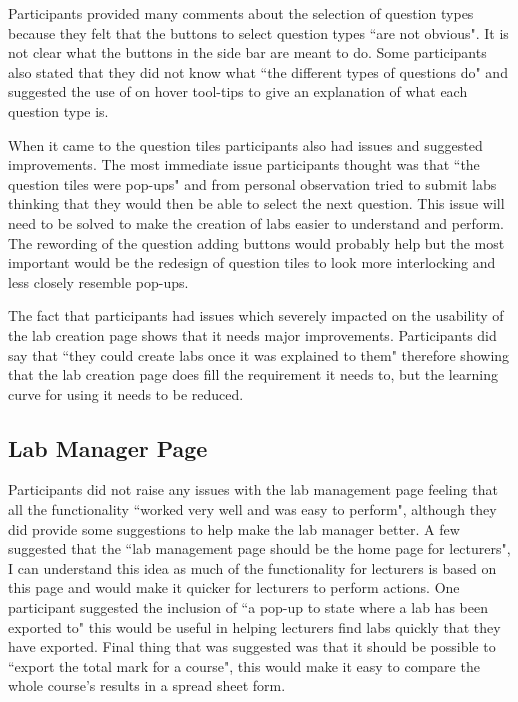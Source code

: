 \documentclass[11pt]{report}
\begin{document}
Participants provided many comments about the selection of question types because they felt that the buttons to select question types ``are not obvious". It is not clear what the buttons in the side bar are meant to do. Some participants also stated that they did not know what ``the different types of questions do" and suggested the use of on hover tool-tips to give an explanation of what each question type is.

When it came to the question tiles participants also had issues and suggested improvements. The most immediate issue participants thought was that ``the question tiles were pop-ups" and from personal observation tried to submit labs thinking that they would then be able to select the next question. This issue will need to be solved to make the creation of labs easier to understand and perform. The rewording of the question adding buttons would probably help but the most important would be the redesign of question tiles to look more interlocking and less closely resemble pop-ups.

The fact that participants had issues which severely impacted on the usability of the lab creation page shows that it needs major improvements. Participants did say that ``they could create labs once it was explained to them" therefore showing that the lab creation page does fill the requirement it needs to, but the learning curve for using it needs to be reduced.



\subsection*{Lab Manager Page}

Participants did not raise any issues with the lab management page feeling that all the functionality ``worked very well and was easy to perform", although they did provide some suggestions to help make the lab manager better. A few suggested that the ``lab management page should be the home page for lecturers", I can understand this idea as much of the functionality for lecturers is based on this page and would make it quicker for lecturers to perform actions. One participant suggested the inclusion of ``a pop-up to state where a lab has been exported to" this would be useful in helping lecturers find labs quickly that they have exported. Final thing that was suggested was that it should be possible to ``export the total mark for a course", this would make it easy to compare the whole course's results in a spread sheet form.
\end{document}
